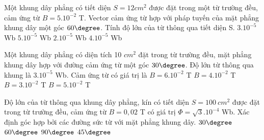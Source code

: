 \begin{vidu}%
Một khung dây phẳng có tiết diện $S =12 cm^2$ được đặt trong một từ trường đều, cảm ứng từ $B=5.10^{-2}$ T. Vector cảm ứng từ  hợp với pháp tuyến của mặt phẳng khung dây một góc $60\degree$. Tính độ lớn của từ thông qua tiết diện S.
\choice
{\True $3.10^{-5}$ Wb}
{$5.10^{-5}$ Wb}
{$2.10^{-5}$ Wb}
{$4.10^{-5}$ Wb}
\end{vidu}
\begin{vidu}%
Một khung dây phẳng có diện tích 10 $cm^2$ đặt trong từ trường đều, mặt phẳng khung dây hợp với đường cảm ứng từ một góc $30\degree$. Độ lớn từ thông qua khung là $3.10^{-5}$  Wb. Cảm ứng từ có giá trị là
\choice
{\True $B = 6.10^{-2}$ T}
{$B = 4.10^{-2}$ T}
{$B = 3.10^{-2}$ T}
{$B = 5.10^{-2}$ T}
\end{vidu}
\begin{vidu}%
Độ lớn của từ thông qua khung dây phẳng, kín có tiết diện $S = 100\ cm^2$ được đặt trong từ trường đều, cảm ứng từ $B=0,02$ T có giá trị $\Phi =\sqrt{3}.10^{-4}$ Wb. Xác định góc hợp bởi các đường sức từ với mặt phẳng khung dây.
\choice
{$30\degree$}
{\True $60\degree$}
{$90\degree$}
{$45\degree$}
\end{vidu}
